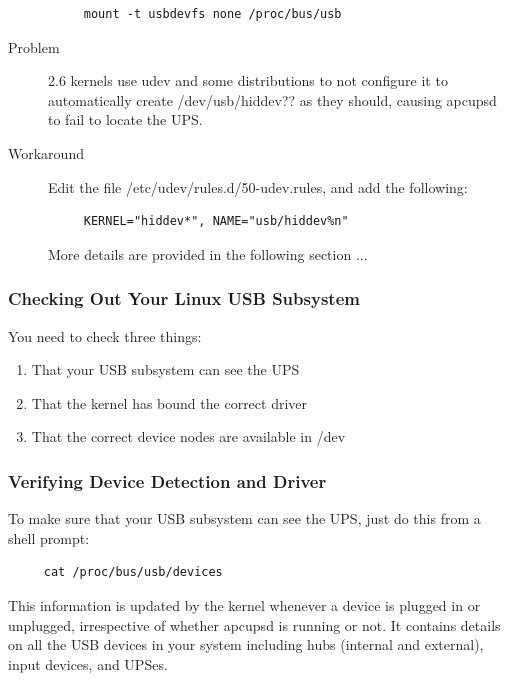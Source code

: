 \begin{description}
\footnotesize
\begin{verbatim}
     mount -t usbdevfs none /proc/bus/usb
\end{verbatim}
\normalsize

\item [Problem]
2.6 kernels use udev and some distributions to not configure it
to automatically create /dev/usb/hiddev?? as they should, causing apcupsd to
fail to locate the UPS.
\item [Workaround]
Edit the file /etc/udev/rules.d/50-udev.rules, and add the following: 

\footnotesize
\begin{verbatim}
     KERNEL="hiddev*", NAME="usb/hiddev%n"
\end{verbatim}
\normalsize

More details are provided in the following section ... 
\end{description}

\label{Checking-Out-Your-Linux-USB-Subsystem}
\subsubsection*{Checking Out Your Linux USB Subsystem}

You need to check three things: 
\begin{enumerate}
   \item That your USB subsystem can see the UPS
   \item That the kernel has bound the correct driver
   \item That the correct device nodes are available in /dev
\end{enumerate}

\subsubsection*{Verifying Device Detection and Driver}

To make sure that your USB subsystem can see the UPS, just do this from a
shell prompt:

\begin{verbatim}
     cat /proc/bus/usb/devices
\end{verbatim}

This information is updated by the kernel whenever a device is plugged in or
unplugged, irrespective of whether apcupsd is running or not. It contains
details on all the USB devices in your system including hubs (internal and
external), input devices, and UPSes.

